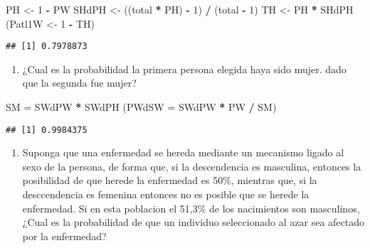 \documentclass[
]{article}
\newenvironment{Shaded}{\begin{snugshade}}{\end{snugshade}}
\newcommand{\AttributeTok}[1]{\textcolor[rgb]{0.13,0.29,0.53}{#1}}
\newcommand{\DecValTok}[1]{\textcolor[rgb]{0.00,0.00,0.81}{#1}}
\newcommand{\NormalTok}[1]{#1}
\newcommand{\OtherTok}[1]{\textcolor[rgb]{0.56,0.35,0.01}{#1}}
\newcommand{\SpecialCharTok}[1]{\textcolor[rgb]{0.81,0.36,0.00}{\textbf{#1}}}
\providecommand{\tightlist}{%
  \setlength{\itemsep}{0pt}\setlength{\parskip}{0pt}}
\begin{document}
\begin{Shaded}
\begin{Highlighting}[]
\NormalTok{PH }\OtherTok{\textless{}{-}} \DecValTok{1} \SpecialCharTok{{-}}\NormalTok{ PW  }
\NormalTok{SHdPH }\OtherTok{\textless{}{-}}\NormalTok{ ((total }\SpecialCharTok{*}\NormalTok{ PH) }\SpecialCharTok{{-}} \DecValTok{1}\NormalTok{) }\SpecialCharTok{/}\NormalTok{ (total }\SpecialCharTok{{-}} \DecValTok{1}\NormalTok{)}
\NormalTok{TH }\OtherTok{\textless{}{-}}\NormalTok{ PH }\SpecialCharTok{*}\NormalTok{ SHdPH}
\NormalTok{(Patl1W }\OtherTok{\textless{}{-}} \DecValTok{1} \SpecialCharTok{{-}}\NormalTok{ TH)}
\end{Highlighting}
\end{Shaded}

\begin{verbatim}
## [1] 0.7978873
\end{verbatim}

\begin{enumerate}
\def\labelenumi{\alph{enumi})}
\setcounter{enumi}{2}
\tightlist
\item
  ¿Cual es la probabilidad la primera persona elegida haya sido mujer.
  dado que la segunda fue mujer?
\end{enumerate}

\begin{Shaded}
\begin{Highlighting}[]
\NormalTok{SM }\OtherTok{=}\NormalTok{ SWdPW }\SpecialCharTok{*}\NormalTok{ SWdPH }
\NormalTok{(}\AttributeTok{PWdSW =}\NormalTok{ SWdPW }\SpecialCharTok{*}\NormalTok{ PW }\SpecialCharTok{/}\NormalTok{ SM)}
\end{Highlighting}
\end{Shaded}

\begin{verbatim}
## [1] 0.9984375
\end{verbatim}

\begin{enumerate}
\def\labelenumi{\arabic{enumi}.}
\setcounter{enumi}{2}
\tightlist
\item
  Suponga que una enfermedad se hereda mediante un mecanismo ligado al
  sexo de la persona, de forma que, si la descendencia es masculina,
  entonces la posibilidad de que herede la enfermedad es 50\%, mientras
  que, si la desccendencia es femenina entonces no es posible que se
  herede la enfermedad. Si en esta poblacion el 51,3\% de los
  nacimientos son masculinos, ¿Cual es la probabilidad de que un
  individuo seleccionado al azar sea afectado por la enfermedad?
\end{enumerate}
\end{document}
